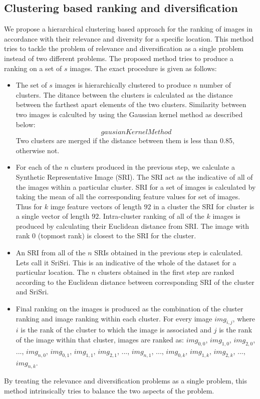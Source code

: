 \documentclass{acm_proc_article-me11_tweaked}
\begin{document}
\subsection{Clustering based ranking and diversification}
We propose a hierarchical clustering based approach for the ranking of images in accordance with their relevance and diversity for a specific location. 
This method tries to tackle the problem of relevance and diversification as a single problem instead of two different problems. 
The proposed method tries to produce a ranking on a set of $s$ images. The exact procedure is given as follows:
\begin{itemize}
 \item The set of $s$ images is hierarchically clustered to produce $n$ number of clusters. The ditance between the clusters is calculated as the distance between the farthest apart elements of the two clusters.
 Similarity between two images is calculted by using the Gaussian kernel method as described below:
 \begin{equation}\label{gaussian-similarity}
  gausianKernelMethod
 \end{equation}
 Two clusters are merged if the distance between them is less than 0.85, otherwise not.
 \item For each of the $n$ clusters produced in the previous step, we calculate a Synthetic Representative Image (SRI). The SRI act as the indicative of all of the images within a particular cluster. 
 SRI for a set of images is calculated by taking the mean of all the corresponding feature values for set of images. 
 Thus for $k$ imge feature vectors of length $92$ in a cluster the SRI for cluster is a single vector of length $92$. Intra-cluster ranking of all of the $k$ images is produced by calculating their Euclidean distance from SRI.
 The image with rank 0 (topmost rank) is closest to the SRI for the cluster.
 \item An SRI from all of the $n$ SRIs obtained in the previous step is calculated. Lets call it SriSri. This is an indicative of the whole of the dataset for a particular location. 
 The $n$ clusters obtained in the first step are ranked according to the Euclidean distance between corresponding SRI of the cluster and SriSri.
 \item Final ranking on the images is produced as the combination of the cluster ranking and image ranking within each cluster. For every image $img_{i,j}$, 
 where $i$ is the rank of the cluster to which the image is associated and $j$ is the rank of the image within that cluster, images are ranked as: 
 $img_{0,0}$, $img_{1,0}$, $img_{2,0}$, ..., $img_{n,0}$, $img_{0,1}$, $img_{1,1}$, $img_{2,1}$, ..., $img_{n,1}$, ..., $img_{0,k}$, $img_{1,k}$, $img_{2,k}$, ..., $img_{n,k}$.

\end{itemize}
By treating the relevance and diversification problems as a single problem, this method intrinsically tries to balance the two aspects of the problem.
\end{document}
